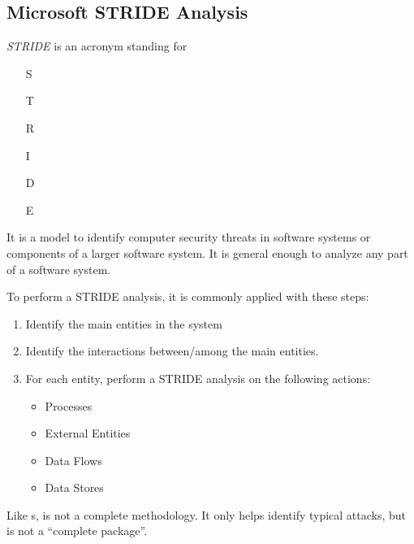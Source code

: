 \subsection{Microsoft STRIDE Analysis}\label{subsec:STRIDE_Analysis}
\begin{definition}\label{def:STRIDE_Analysis}
  \emph{STRIDE} is an acronym standing for
  \begin{itemize}[noitemsep]
  \item [S] 
  \item [T] 
  \item [R] 
  \item [I] 
  \item [D] 
  \item [E] 
  \end{itemize}

  It is a model to identify computer security threats in software systems or components of a larger software system.
  It is general enough to analyze any part of a software system.

  To perform a STRIDE analysis, it is commonly applied with these steps:
  \begin{enumerate}[noitemsep]
  \item Identify the main entities in the system
  \item Identify the interactions between/among the main entities.
  \item For each entity, perform a STRIDE analysis on the following actions:
    \begin{itemize}[noitemsep]
    \item Processes
    \item External Entities
    \item Data Flows
    \item Data Stores
    \end{itemize}
  \end{enumerate}

  \begin{remark}\label{rmk:STRIDE_Incomplete_Methodology}
    Like s,  is not a complete methodology.
    It only helps identify typical attacks, but is not a ``complete package''.
  \end{remark}
\end{definition}

